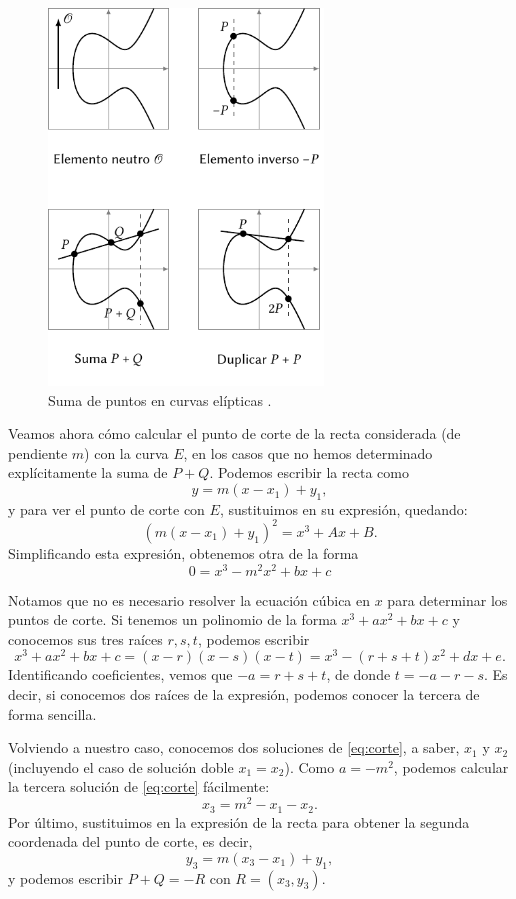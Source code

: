 \documentclass[
  a4paper,
  12pt,
  spanish,
]{scrartcl}
\begin{document}
\begin{figure}[h]
  \centering
  \includegraphics[width=0.65\textwidth]{img/operaciones-curvas}
  \caption{Suma de puntos en curvas elípticas \parencite{eichlseder_elliptic_2016}.}
  \label{fig:operaciones-curvas}
\end{figure}

Veamos ahora cómo calcular el punto de corte de la recta considerada (de pendiente $m$) con la curva $E$, en los casos que no hemos determinado explícitamente la suma de $P+Q$. Podemos escribir la recta como \[ y = m(x - x_1) + y_1, \] y para ver el punto de corte con $E$, sustituimos en su expresión, quedando: \[ (m(x - x_1) + y_1)^2 = x^3 + Ax + B. \] Simplificando esta expresión, obtenemos otra de la forma
\begin{equation}
    \label{eq:corte}
	0 = x^3 - m^2x^2 + bx + c 
\end{equation} 

    Notamos que no es necesario resolver la ecuación cúbica en $x$ para determinar los puntos de corte. Si tenemos un polinomio de la forma $x^3 + ax^2 + bx + c$ y conocemos sus tres raíces $r,s,t$, podemos escribir \[ x^3 + ax^2 + bx + c = (x-r)(x-s)(x-t) = x^3 - (r+s+t)x^2 + dx + e. \] Identificando coeficientes, vemos que $-a = r + s + t$, de donde $t = -a -r -s$. Es decir, si conocemos dos raíces de la expresión, podemos conocer la tercera de forma sencilla.
    
    Volviendo a nuestro caso, conocemos dos soluciones de \eqref{eq:corte}, a saber, $x_1$ y $x_2$ (incluyendo el caso de solución doble $x_1=x_2$). Como $a = -m^2$, podemos calcular la tercera solución de \eqref{eq:corte} fácilmente: \[ x_3 = m^2 - x_1 - x_2. \] Por último, sustituimos en la expresión de la recta para obtener la segunda coordenada del punto de corte, es decir, \[y_3 = m(x_3 - x_1) + y_1, \] y podemos escribir $P+Q = -R$ con $R=(x_3, y_3)$.
    
\end{document}
